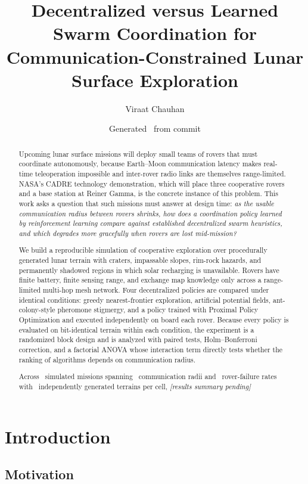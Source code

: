 \documentclass[11pt]{article}
\title{\textbf{Decentralized versus Learned Swarm Coordination for\\
Communication-Constrained Lunar Surface Exploration}}
\author{Viraat Chauhan}
\date{Generated \GenDate\ from commit \texttt{\GenCommit}}
\begin{document}
\maketitle

\begin{abstract}
\noindent
Upcoming lunar surface missions will deploy small teams of rovers that must
coordinate autonomously, because Earth--Moon communication latency makes
real-time teleoperation impossible and inter-rover radio links are themselves
range-limited. NASA's CADRE technology demonstration, which will place three
cooperative rovers and a base station at Reiner Gamma, is the concrete instance
of this problem. This work asks a question that such missions must answer at
design time: \emph{as the usable communication radius between rovers shrinks,
how does a coordination policy learned by reinforcement learning compare against
established decentralized swarm heuristics, and which degrades more gracefully
when rovers are lost mid-mission?}

We build a reproducible simulation of cooperative exploration over procedurally
generated lunar terrain with craters, impassable slopes, rim-rock hazards, and
permanently shadowed regions in which solar recharging is unavailable. Rovers
have finite battery, finite sensing range, and exchange map knowledge only
across a range-limited multi-hop mesh network. Four decentralized policies are
compared under identical conditions: greedy nearest-frontier exploration,
artificial potential fields, ant-colony-style pheromone stigmergy, and a
policy trained with Proximal Policy Optimization and executed independently on
board each rover. Because every policy is evaluated on bit-identical terrain
within each condition, the experiment is a randomized block design and is
analyzed with paired tests, Holm--Bonferroni correction, and a factorial ANOVA
whose interaction term directly tests whether the ranking of algorithms depends
on communication radius.

Across \NTrialsMain\ simulated missions spanning \NCommRadii\ communication
radii and \NFailureRates\ rover-failure rates with \NSeeds\ independently
generated terrains per cell, \textit{[results summary pending]}
\end{abstract}

\section{Introduction}

\subsection{Motivation}
\end{document}
